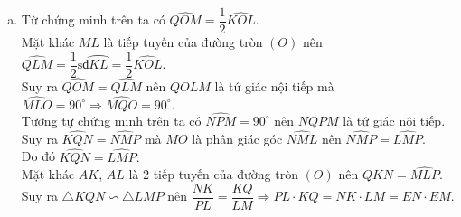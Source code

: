 \begin{bt}
{\begin{enumerate}[a)]
			
			\item 
			Từ chứng minh trên ta có $\widehat{QOM}=\dfrac{1}{2}\widehat{KOL}$.\\
			Mặt khác $ML$ là tiếp tuyến của đường tròn $(O)$ nên $\widehat{QLM}=\dfrac{1}{2}\text{sđ}\wideparen{KL}=\dfrac{1}{2}\widehat{KOL}.$\\
			Suy ra $\widehat{QOM}=\widehat{QLM}$ nên $QOLM$ là tứ giác nội tiếp mà $\widehat{MLO}=90^{\circ}\Rightarrow \widehat{MQO}=90^{\circ}.$\\
			Tương tự chứng minh trên ta có $\widehat{NPM}=90^{\circ}$ nên $NQPM$ là tứ giác nội tiếp.\\
			Suy ra $\widehat{KQN}=\widehat{NMP}$ mà $MO$ là phân giác góc $\widehat{NML}$ nên $\widehat{NMP}=\widehat{LMP}.$\\
			Do đó $\widehat{KQN}=\widehat{LMP}.$\\
			Mặt khác $AK$, $AL$ là 2 tiếp tuyến của đường tròn $(O)$ nên $\widehat{QKN}=\widehat{MLP}$.\\
			Suy ra $\triangle KQN \backsim \triangle LMP$ nên $\dfrac{NK}{PL}=\dfrac{KQ}{LM} \Rightarrow PL\cdot KQ=NK\cdot LM=EN\cdot EM$.
		\end{enumerate}
	}
\end{bt}



